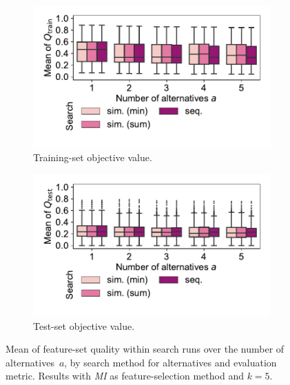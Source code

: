 \documentclass[iicol, sn-basic, Numbered]{sn-jnl} %
\theoremstyle{plain}
\theoremstyle{definition}
\begin{document}
\begin{figure}[t]
	\centering
	\begin{subfigure}[t]{0.49\textwidth}
		\centering
		\includegraphics[width=\textwidth, trim=15 20 10 10, clip]{plots/afs-impact-search-mean-train-objective.pdf}
		\caption{Training-set objective value.}
		\label{fig:afs:impact-search-mean-train-objective}
	\end{subfigure}
	\hfill
	\begin{subfigure}[t]{0.49\textwidth}
		\centering
		\includegraphics[width=\textwidth, trim=15 20 10 10, clip]{plots/afs-impact-search-mean-test-objective.pdf}
		\caption{Test-set objective value.}
		\label{fig:afs:impact-search-mean-test-objective}
	\end{subfigure}
	\caption{
		Mean of feature-set quality within search runs over the number of alternatives~$a$, by search method for alternatives and evaluation metric.
		Results with \emph{MI} as feature-selection method and $k=5$.
	}
	\label{fig:afs:impact-search-mean}
\end{figure}
\end{document}
